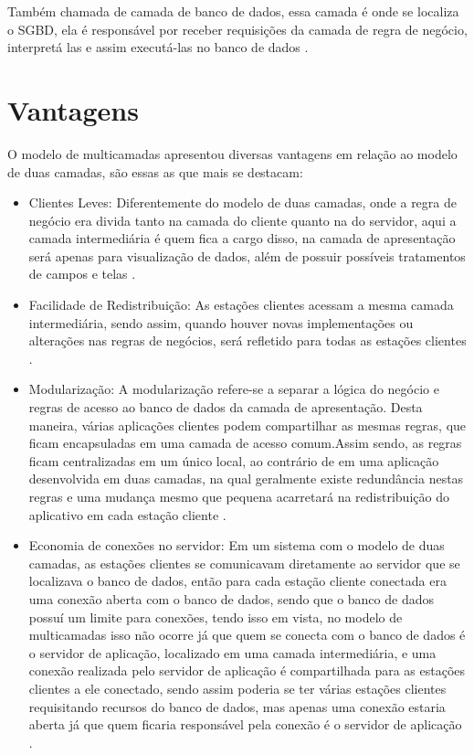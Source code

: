 Também chamada de camada de banco de dados, essa camada é onde se localiza o \ac{SGBD}, ela é responsável por receber requisições da camada de regra de negócio, interpretá las e assim executá-las no banco de dados  \cite{devmediaMultiCamada2018}.


\section{Vantagens}

O modelo de multicamadas apresentou diversas vantagens em relação ao modelo de duas camadas, são essas as que mais se destacam:
\begin{itemize}
\item Clientes Leves: Diferentemente do modelo de duas camadas, onde a regra de negócio era divida tanto na camada do cliente quanto na do servidor, aqui a camada intermediária é quem fica a cargo disso, na camada de apresentação será apenas para visualização de dados, além de possuir possíveis tratamentos de campos e telas  \cite{devmediaMultiCamada2018}.

\item Facilidade de Redistribuição: As estações clientes acessam a mesma camada intermediária, sendo assim, quando houver novas implementações ou alterações nas regras de negócios, será refletido para todas as estações clientes  \cite{devmediaMultiCamada2018}.

\item Modularização: A modularização refere-se a separar a lógica do negócio e regras de acesso ao banco de dados da camada de apresentação. Desta maneira, várias aplicações clientes podem compartilhar as mesmas regras, que ficam encapsuladas em uma camada de acesso comum.Assim sendo, as regras ficam centralizadas em um único local, ao contrário de em uma aplicação desenvolvida em duas camadas, na qual geralmente existe redundância nestas regras e uma mudança mesmo que pequena acarretará na redistribuição do aplicativo em cada estação cliente \cite{devmediaMultiCamada2018}.

\item Economia de conexões no servidor: Em um sistema com o modelo de duas camadas, as estações clientes se comunicavam diretamente ao servidor que se localizava o banco de dados, então para cada estação cliente conectada era uma conexão aberta com o banco de dados, sendo que o banco de dados possuí um limite para conexões, tendo isso em vista, no modelo de multicamadas isso não ocorre já que quem se conecta com o banco de dados é o servidor de aplicação, localizado em uma camada intermediária, e uma conexão realizada pelo servidor de aplicação é compartilhada para as estações clientes a ele conectado, sendo assim poderia se ter várias estações clientes requisitando recursos do banco de dados, mas apenas uma conexão estaria aberta já que quem ficaria responsável pela conexão é o servidor de aplicação \cite{devmediaMultiCamada2018}.


\end{itemize}
